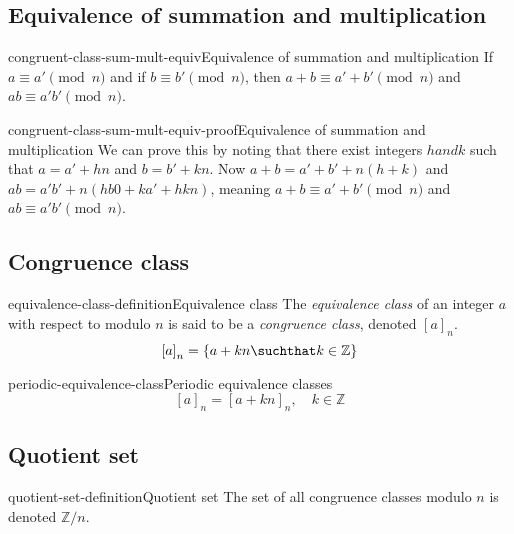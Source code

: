 \documentclass[preview]{standalone}
\begin{document}
\subsection{Equivalence of summation and multiplication}

\begin{snippetproposition}{congruent-class-sum-mult-equiv}{Equivalence of summation and multiplication}
    If \(a \equiv a' \pmod{n}\) and if \(b \equiv b' \pmod{n}\), then
    \(a+b \equiv a' + b' \pmod{n}\) and \(ab \equiv a'b' \pmod{n}\).
\end{snippetproposition}

\begin{snippetproof}{congruent-class-sum-mult-equiv-proof}{Equivalence of summation and multiplication}
    We can prove this by noting that there exist integers \(h and k\) such that
    \(a=a'+hn\) and \(b=b'+kn\).
    Now \(a+b = a'+b'+n(h+k)\) and \(ab=a'b' + n(hb0+ka'+hkn)\), meaning
    \(a+b \equiv a' + b' \pmod{n}\) and \(ab \equiv a'b' \pmod{n}\).
\end{snippetproof}

\subsection{Congruence class}

\begin{snippetdefinition}{equivalence-class-definition}{Equivalence class}
    The \textit{equivalence class} of an integer \(a\) with respect to modulo \(n\)
    is said to be a \textit{congruence class}, denoted \({[a]}_n\).
    \[
        {[a]}_n = \{a+kn \suchthat k \in \mathbb{Z}\}
    \]
\end{snippetdefinition}

\begin{snippetproposition}{periodic-equivalence-class}{Periodic equivalence classes}
    \[
        {[a]}_n = {[a + kn]}_n,\quad k \in \mathbb{Z}
    \]
\end{snippetproposition}

\subsection{Quotient set}

\begin{snippetdefinition}{quotient-set-definition}{Quotient set}
    The set of all congruence classes modulo \(n\) is denoted \(\mathbb{Z} / n\).
\end{snippetdefinition}
\end{document}
